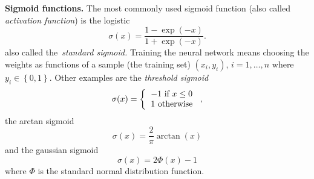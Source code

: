 \documentclass[11pt,twoside]{article}%
\theoremstyle{change}
\begin{document}
\textbf{Sigmoid functions.} The most commonly used sigmoid function (also
called \textit{activation function}) is the logistic
\[
\sigma(x)=\frac{1-\exp(-x)}{1+\exp(-x)}.
\]
also called the\textit{\ standard sigmoid.} Training the neural network means
choosing the weights as functions of a sample (the training set) $\left(
x_{i},y_{i}\right)  $, $i=1,\ldots,n$ where $y_{i}\in\left\{  0,1\right\}  $.
Other examples are the \textit{threshold sigmoid}
\[
\sigma(x)=\left\{
\begin{tabular}
[c]{l}%
$-1$ if $x\leq0$\\
$1$ otherwise
\end{tabular}
\right.  ,
\]
the arctan sigmoid
\[
\sigma(x)=\frac{2}{\pi}\arctan(x)
\]
and the gaussian sigmoid
\[
\sigma(x)=2\Phi(x)-1
\]
where $\Phi$ is the standard normal distribution function.
\end{document}
